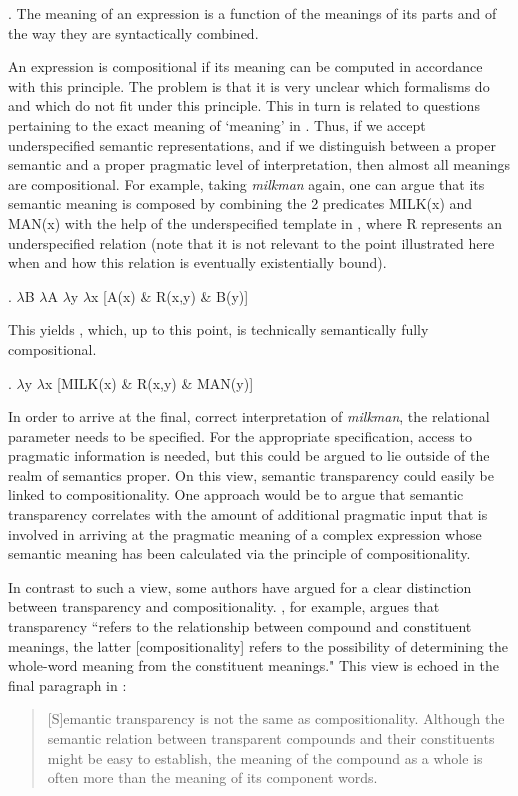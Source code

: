 \ex. The meaning of an expression is a function of the meanings of its parts
and of the way they are syntactically combined.

An expression is compositional if its meaning can be computed in accordance
with this principle. The problem is that it is very unclear which formalisms
do and which do not fit under this principle. This in turn is related to
questions pertaining to the exact meaning of `meaning' in \Last.
Thus, if we accept underspecified semantic
representations, and if we distinguish between a proper semantic and a proper
pragmatic level of interpretation, then almost all meanings are compositional. For example,
taking \emph{milkman} again, one can argue that  its semantic meaning is composed by combining
the 2 predicates MILK(x) and MAN(x) with the help of the
underspecified template in \Next, where R represents an underspecified relation (note that it is not relevant to the point illustrated here when and how this relation is eventually existentially bound).

\ex. $\lambda$B $\lambda$A $\lambda$y $\lambda$x [A(x) \& R(x,y)
\& B(y)] \label{ex:underspec}

This yields \Next, which, up to this point, is technically semantically
fully compositional.

\ex. $\lambda$y $\lambda$x [MILK(x) \& R(x,y)
\& MAN(y)] \label{ex:underspecConcrete}

In order to arrive at the final, correct interpretation of
\emph{milkman}, the relational parameter needs to
be specified. For the appropriate specification, access
to pragmatic information is needed, but this could be argued to lie outside of the realm
of semantics proper.
On this view, semantic transparency could easily be linked to 
compositionality. One approach would be to argue that semantic transparency correlates with the amount of
additional pragmatic input that is involved in arriving at the pragmatic meaning of a
complex expression whose semantic meaning has been calculated via the
principle of compositionality. 

In contrast to such a view, some authors have argued for a clear distinction
between transparency and compositionality. \citet[550]{Sandra:1990}, for
example, argues that transparency ``refers to the relationship between compound and constituent meanings, the latter [compositionality] refers to the possibility of determining the whole-word
meaning from the constituent meanings." This view is echoed in the final
paragraph in \citet{Zwitserlood:1994}:
\begin{quotation}
[S]emantic
transparency is not the same as compositionality. Although
the semantic relation between transparent compounds and their constituents
might be easy to establish, the meaning of the compound as a whole is often
more than the meaning of its component words.\\ \citep[366]{Zwitserlood:1994}  
\end{quotation}

